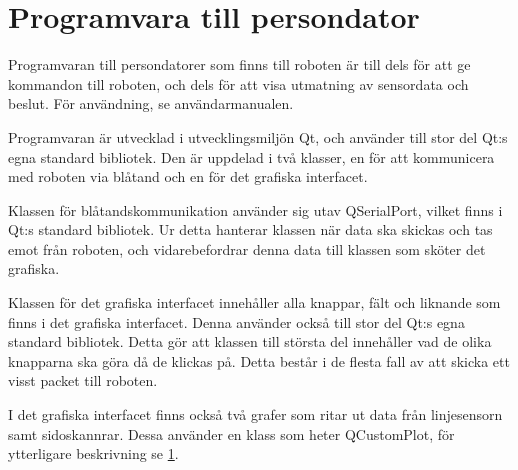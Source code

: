 \section{Programvara till persondator}
Programvaran till persondatorer som finns till roboten är till dels för att ge kommandon till roboten, och dels för att visa utmatning av sensordata och beslut. För användning, se användarmanualen.

Programvaran är utvecklad i utvecklingsmiljön Qt, och använder till stor del Qt:s egna standard bibliotek. Den är uppdelad i två klasser, en för att kommunicera med roboten via blåtand och en för det grafiska interfacet.

Klassen för blåtandskommunikation använder sig utav QSerialPort, vilket finns i Qt:s standard bibliotek. Ur detta hanterar klassen när data ska skickas och tas emot från roboten, och vidarebefordrar denna data till klassen som sköter det grafiska.

Klassen för det grafiska interfacet innehåller alla knappar, fält och liknande som finns i det grafiska interfacet. Denna använder också till stor del Qt:s egna standard bibliotek. Detta gör att klassen till största del innehåller vad de olika knapparna ska göra då de klickas på. Detta består i de flesta fall av att skicka ett visst packet till roboten.

I det grafiska interfacet finns också två grafer som ritar ut data från linjesensorn samt sidoskannrar. Dessa använder en klass som heter QCustomPlot, för ytterligare beskrivning se \ref{}.  